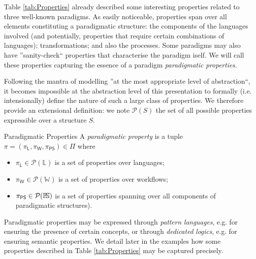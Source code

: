 Table \ref{tab:Properties} already described some interesting properties 
related to three well-known paradigms. As easily noticeable, properties span 
over all elements constituting a paradigmatic structure: the components of the 
languages involved (and potentially, properties that require certain 
combinations of languages); transformations; and also the processes. Some 
paradigms may also have ''sanity-check`` properties that characterise the 
paradigm iself. We will call these properties capturing the essence of a 
paradigm \emph{paradigmatic properties}.

Following the mantra of modelling ''at the most appropriate 
level of abstraction``, it becomes impossible at the abstraction level of this 
presentation to formally (i.e. intensionally) define the nature of such a large 
class of properties. We therefore provide an extensional definition: we note 
$\mathcal{P}(S)$ the set of all possible properties expressible over a 
structure $S$. 


\begin{Definition}{Paradigmatic Properties}
   A \emph{paradigmatic property} is a tuple 
$\pi = (\pi_{\mathsf{L}},\pi_{\mathsf{W}},\pi_{\mathsf{PS}}) \in \Pi$ where
\begin{itemize}
   \item $\pi_{\mathsf{L}} \in \mathcal{P}(\mathbb{L})$ is a set of properties 
over languages;
   \item $\pi_{\mathsf{W}} \in \mathcal{P}(\mathbb{W})$ is a set of properties 
over workflows;
   \item $\pi_{\mathsf{PS}}\in\mathcal{P}(\mathbb{P}\!\mathbb{S})$ is a set of 
properties spanning over all components of paradigmatic structures).
\end{itemize}
\end{Definition}
\noindent
Paradigmatic properties may be expressed through \emph{pattern languages}, e.g. 
for ensuring the presence of certain concepts, or through \emph{dedicated 
logics}, e.g. for ensuring semantic properties. We detail later in the examples 
how some properties described in Table \ref{tab:Properties} may be captured 
precisely.

